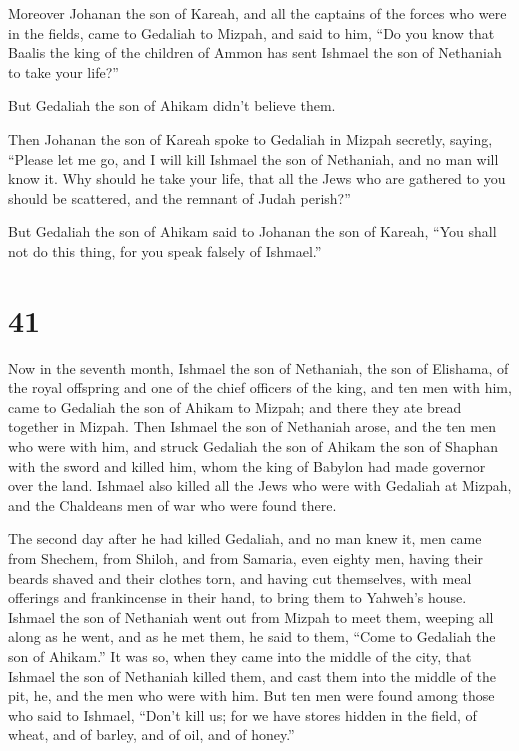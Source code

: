  Moreover Johanan the son of Kareah, and all the captains
of the forces who were in the fields, came to Gedaliah to Mizpah,
 and said to him, ``Do you know that Baalis the king of
the children of Ammon has sent Ishmael the son of Nethaniah to take your
life?''

But Gedaliah the son of Ahikam didn't believe them.

 Then Johanan the son of Kareah spoke to Gedaliah in
Mizpah secretly, saying, ``Please let me go, and I will kill Ishmael the
son of Nethaniah, and no man will know it. Why should he take your life,
that all the Jews who are gathered to you should be scattered, and the
remnant of Judah perish?''

 But Gedaliah the son of Ahikam said to Johanan the son
of Kareah, ``You shall not do this thing, for you speak falsely of
Ishmael.''

\hypertarget{section-40}{%
\section{41}\label{section-40}}

 Now in the seventh month, Ishmael the son of Nethaniah,
the son of Elishama, of the royal offspring and one of the chief
officers of the king, and ten men with him, came to Gedaliah the son of
Ahikam to Mizpah; and there they ate bread together in Mizpah.
 Then Ishmael the son of Nethaniah arose, and the ten men
who were with him, and struck Gedaliah the son of Ahikam the son of
Shaphan with the sword and killed him, whom the king of Babylon had made
governor over the land.  Ishmael also killed all the Jews
who were with Gedaliah at Mizpah, and the Chaldeans men of war who were
found there.

 The second day after he had killed Gedaliah, and no man
knew it,  men came from Shechem, from Shiloh, and from
Samaria, even eighty men, having their beards shaved and their clothes
torn, and having cut themselves, with meal offerings and frankincense in
their hand, to bring them to Yahweh's house.  Ishmael the
son of Nethaniah went out from Mizpah to meet them, weeping all along as
he went, and as he met them, he said to them, ``Come to Gedaliah the son
of Ahikam.''  It was so, when they came into the middle of
the city, that Ishmael the son of Nethaniah killed them, and cast them
into the middle of the pit, he, and the men who were with him.
 But ten men were found among those who said to Ishmael,
``Don't kill us; for we have stores hidden in the field, of wheat, and
of barley, and of oil, and of honey.''

